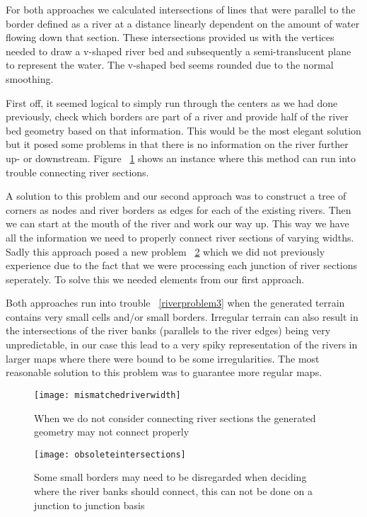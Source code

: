 For both approaches we calculated intersections of lines that were parallel to the border defined as a river at a distance linearly dependent on the amount of water flowing down that section. These intersections provided us with the vertices needed to draw a v-shaped river bed and subsequently a semi-translucent plane to represent the water. The v-shaped bed seems rounded due to the normal smoothing.

First off, it seemed logical to simply run through the centers as we had done previously, check which borders are part of a river and provide half of the river bed geometry based on that information. This would be the most elegant solution but it posed some problems in that there is no information on the river further up- or downstream. Figure ~\ref{riverproblem1} shows an instance where this method can run into trouble connecting river sections.

A solution to this problem and our second approach was to construct a tree of corners as nodes and river borders as edges for each of the existing rivers. Then we can start at the mouth of the river and work our way up. This way we have all the information we need to properly connect river sections of varying widths. Sadly this approach posed a new problem ~\ref{riverproblem2} which we did not previously experience due to the fact that we were processing each junction of river sections seperately. To solve this we needed elements from our first approach. 

Both approaches run into trouble ~\ref{riverproblem3} when the generated terrain contains very small cells and/or small borders. Irregular terrain can also result in the intersections of the river banks (parallels to the river edges) being very unpredictable, in our case this lead to a very spiky representation of the rivers in larger maps where there were bound to be some irregularities. The most reasonable solution to this problem was to guarantee more regular maps.

\begin{figure}
	\centering
	\texttt{[image: mismatchedriverwidth]}
	\caption{When we do not consider connecting river sections the generated geometry may not connect properly}
	\label{riverproblem1}
\end{figure}

\begin{figure}
	\centering
	\texttt{[image: obsoleteintersections]}
	\caption{Some small borders may need to be disregarded when deciding where the river banks should connect, this can not be done on a junction to junction basis}
	\label{riverproblem2}
\end{figure}

